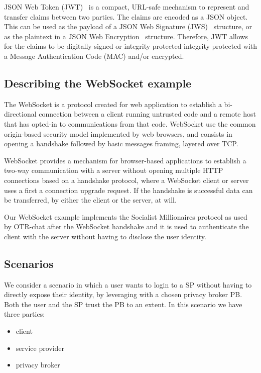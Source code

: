 JSON Web Token (JWT)~\cite{jones2015json} is a compact, URL-safe mechanism to represent and transfer claims between two parties. The claims are encoded as a JSON object. This can be used as the payload of a JSON Web Signature (JWS)~\cite{jones2014n} structure, or as the plaintext in a JSON Web Encryption~\cite{jones2015jwe} structure. Therefore, JWT allows for the claims to be digitally signed or integrity protected integrity protected with a Message Authentication Code (MAC) and/or encrypted.

\subsection{Describing the WebSocket example}

The WebSocket is a protocol created for web application to establish a bi-directional connection between a client running untrusted code and a remote host that has opted-in to communications from that code. 
WebSocket use the common origin-based security model implemented by web browsers, and consists in opening a handshake followed by basic messages framing, layered over TCP.

WebSocket provides a mechanism for browser-based applications to establish a two-way communication with a server without opening multiple HTTP connections based on a handshake protocol, where a WebSocket client or server uses a first a connection upgrade request. If the handshake is successful data can be transferred, by either the client or the server, at will.

Our WebSocket example implements the Socialist Millionaires protocol as used by OTR-chat after the WebSocket handshake and it is used to authenticate the client with the server without having to disclose the user identity.

\subsection{Scenarios}

We consider a scenario in which a user wants to login to a SP without having to directly expose their identity, by leveraging with a chosen privacy broker PB. Both the user and the SP trust the PB to an extent. In this scenario we have three parties:
\begin{itemize}
    \item client
    \item service provider
    \item privacy broker
\end{itemize}

